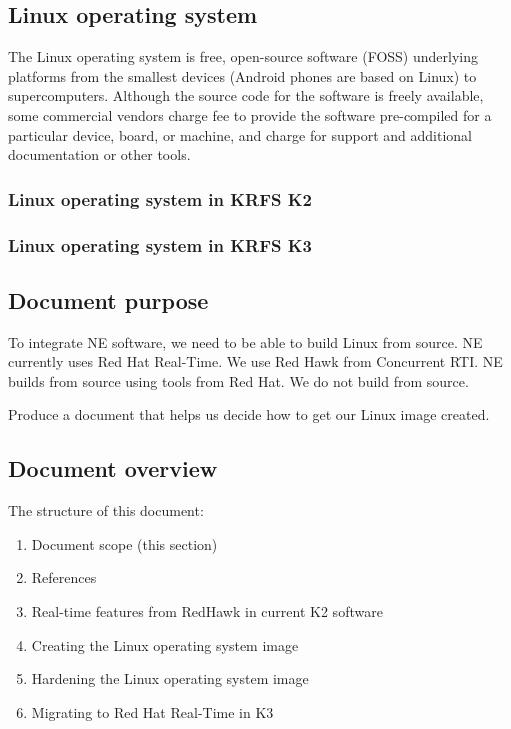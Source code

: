 \documentclass[12pt]{article}
\begin{document}
\subsection{Linux operating system}
The Linux operating system is free, open-source software (FOSS) underlying platforms from the smallest devices (Android phones are based on Linux) to supercomputers. Although the source code for the software is freely available, some commercial vendors charge fee to provide the software pre-compiled for a particular device, board, or machine, and charge for support and additional documentation or other tools.


\subsubsection{Linux operating system in KRFS K2}



\subsubsection{Linux operating system in KRFS K3}


\subsection{Document purpose}
To integrate NE software, we need to be able to build Linux from source.  NE currently uses Red Hat Real-Time.  We use Red Hawk from Concurrent RTI.  NE builds from source using tools from Red Hat.  We do not build from source.

Produce a document that helps us decide how to get our Linux image created.


\subsection{Document overview}
The structure of this document:

\begin{enumerate}
    \item Document scope (this section)
    \item References
    \item Real-time features from RedHawk in current K2 software
    \item Creating the Linux operating system image
    \item Hardening the Linux operating system image
    \item Migrating to Red Hat Real-Time in K3
\end{enumerate}
\end{document}
